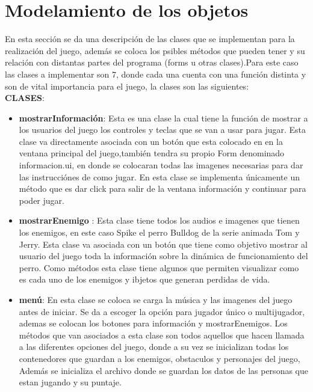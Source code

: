 \documentclass{article}
\begin{document}
\section{Modelamiento de los objetos} \label{ideas}
\noindent
En esta sección se da una descripción de las clases que se implementan para la realización del juego, además se coloca los psibles métodos que pueden tener y su relación con distantas partes del programa (forms u otras clases).Para este caso las clases a implementar son 7, donde cada una cuenta con una función distinta y son de vital importancia para el juego, la clases son las siguientes:\\


\noindent\textbf{CLASES}:\
\begin{itemize}

\item\noindent\textbf{mostrarInformación}: 
Esta es una clase la cual  tiene la función de mostrar a los usuarios del juego los controles y teclas que se van a usar para jugar. Esta clase va directamente asociada con un botón que esta colocado en en la ventana principal del juego,también tendra su propio Form denominado informacion.ui, en donde se colocaran todas las imagenes necesarias para dar las instrucciónes de como jugar. En esta clase se implementa únicamente un método que es dar click para salir de la ventana información y continuar para poder jugar.\\ 


\item\noindent\textbf{mostrarEnemigo} : 
Esta clase tiene todos los audios e imagenes que tienen los enemigos, en este caso Spike el perro Bulldog de la serie animada Tom y Jerry. Esta clase va asociada con un botón que tiene como objetivo mostrar al usuario del juego toda la información sobre la dinámica de funcionamiento del perro. Como métodos esta clase tiene algunos que permiten  visualizar como es cada uno de los enemigos y ibjetos que generan perdidas de vida.\\

\item\noindent\textbf{menú}: 
En esta clase se coloca se carga la música y las imagenes del juego antes de iniciar. Se da a escoger la opción para jugador único o multijugador, ademas se colocan los botones para información y mostrarEnemigos. Los métodos que van asociados a esta clase son todos aquellos que hacen llamada a las diferentes opciones del juego, donde a su vez se inicializan todas los contenedores que guardan a los enemigos, obstaculos y personajes del juego, Además se inicializa el archivo donde se guardan los datos de las personas que estan jugando y su puntaje.\\
 

\end{itemize}
\end{document}

